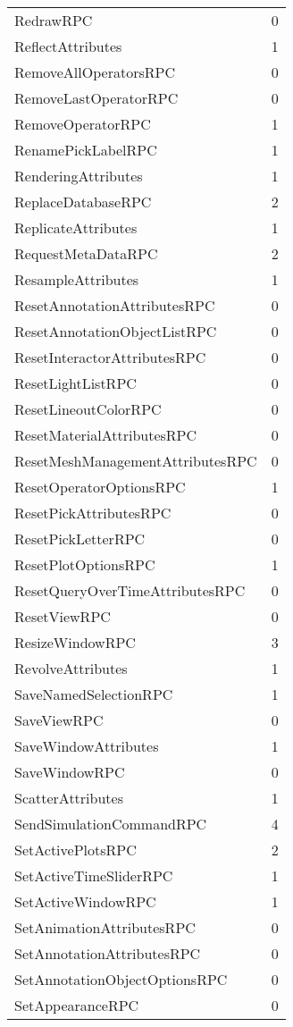 \documentclass[10pt,a4paper]{report}
\begin{document}
\begin{longtable}{ll}
RedrawRPC & 0 \\
ReflectAttributes & 1 \\
RemoveAllOperatorsRPC & 0 \\
RemoveLastOperatorRPC & 0 \\
RemoveOperatorRPC & 1 \\
RenamePickLabelRPC & 1 \\
RenderingAttributes & 1 \\
ReplaceDatabaseRPC & 2 \\
ReplicateAttributes & 1 \\
RequestMetaDataRPC & 2 \\
ResampleAttributes & 1 \\
ResetAnnotationAttributesRPC & 0 \\
ResetAnnotationObjectListRPC & 0 \\
ResetInteractorAttributesRPC & 0 \\
ResetLightListRPC & 0 \\
ResetLineoutColorRPC & 0 \\
ResetMaterialAttributesRPC & 0 \\
ResetMeshManagementAttributesRPC & 0 \\
ResetOperatorOptionsRPC & 1 \\
ResetPickAttributesRPC & 0 \\
ResetPickLetterRPC & 0 \\
ResetPlotOptionsRPC & 1 \\
ResetQueryOverTimeAttributesRPC & 0 \\
ResetViewRPC & 0 \\
ResizeWindowRPC & 3 \\
RevolveAttributes & 1 \\
SaveNamedSelectionRPC & 1 \\
SaveViewRPC & 0 \\
SaveWindowAttributes & 1 \\
SaveWindowRPC & 0 \\
ScatterAttributes & 1 \\
SendSimulationCommandRPC & 4 \\
SetActivePlotsRPC & 2 \\
SetActiveTimeSliderRPC & 1 \\
SetActiveWindowRPC & 1 \\
SetAnimationAttributesRPC & 0 \\
SetAnnotationAttributesRPC & 0 \\
SetAnnotationObjectOptionsRPC & 0 \\
SetAppearanceRPC & 0 \\

\end{longtable}
\end{document}

